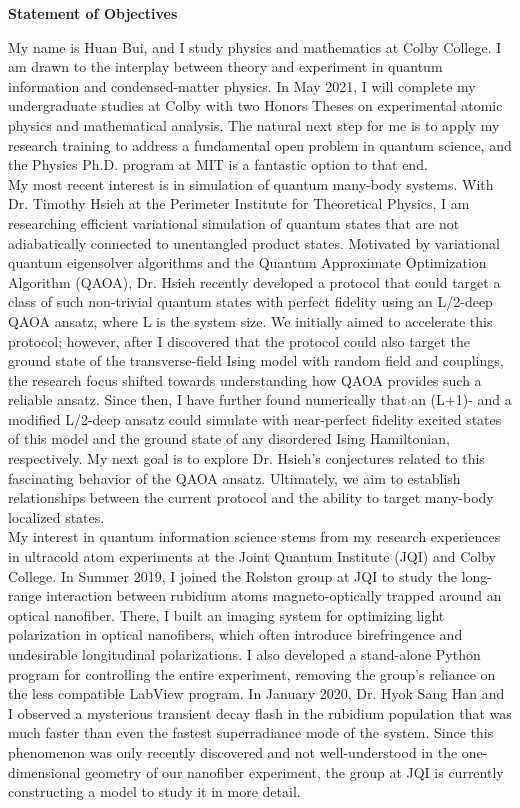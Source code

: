 \documentclass[12pt]{article}
\begin{document}
\begin{center}
	\textbf{Statement of Objectives}
\end{center}
My name is Huan Bui, and I study physics and mathematics at Colby College. I am drawn to the interplay between theory and experiment in quantum information and condensed-matter physics.  In May 2021, I will complete my undergraduate studies at Colby with two Honors Theses on experimental atomic physics and mathematical analysis. The natural next step for me is to apply my research training to address a fundamental open problem in quantum science, and the Physics Ph.D. program at MIT is a fantastic option to that end.  \\ 

My most recent interest is in simulation of quantum many-body systems. With Dr. Timothy Hsieh at the Perimeter Institute for Theoretical Physics, I am researching efficient variational simulation of quantum states that are not adiabatically connected to unentangled product states. Motivated by variational quantum eigensolver algorithms and the Quantum Approximate Optimization Algorithm (QAOA), Dr. Hsieh recently developed a protocol that could target a class of such non-trivial quantum states with perfect fidelity using an L/2-deep QAOA ansatz, where L is the system size. We initially aimed to accelerate this protocol; however, after I discovered that the protocol could also target the ground state of the transverse-field Ising model with random field and couplings, the research focus shifted towards understanding how QAOA provides such a reliable ansatz. Since then, I have further found numerically that an (L+1)- and a modified L/2-deep ansatz could simulate with near-perfect fidelity excited states of this model and the ground state of any disordered Ising Hamiltonian, respectively. My next goal is to explore Dr. Hsieh's conjectures related to this fascinating behavior of the QAOA ansatz. Ultimately, we aim to establish relationships between the current protocol and the ability to target many-body localized states.\\

My interest in quantum information science stems from my research experiences in ultracold atom experiments at the Joint Quantum Institute (JQI) and Colby College. In Summer 2019, I joined the Rolston group at JQI to study the long-range interaction between rubidium atoms magneto-optically trapped around an optical nanofiber. There, I built an imaging system for optimizing light polarization in optical nanofibers, which often introduce birefringence and undesirable longitudinal polarizations. I also developed a stand-alone Python program for controlling the entire experiment, removing the group's reliance on the less compatible LabView program. In January 2020, Dr. Hyok Sang Han and I observed a mysterious transient decay flash in the rubidium population that was much faster than even the fastest superradiance mode of the system. Since this phenomenon was only recently discovered and not well-understood in the one-dimensional geometry of our nanofiber experiment, the group at JQI is currently constructing a model to study it in more detail.   \\ 
\end{document}
